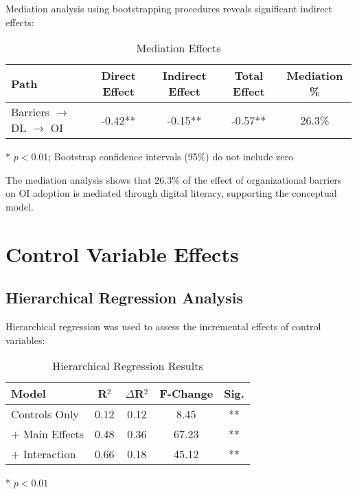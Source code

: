 Mediation analysis using bootstrapping procedures reveals significant indirect effects:

\begin{table}[H]
\centering
\caption{Mediation Effects}
\label{tab:mediation}
\begin{tabular}{@{}lcccc@{}}
\toprule
\textbf{Path} & \textbf{Direct Effect} & \textbf{Indirect Effect} & \textbf{Total Effect} & \textbf{Mediation \%} \\
\midrule
Barriers $\rightarrow$ DL $\rightarrow$ OI & -0.42** & -0.15** & -0.57** & 26.3\% \\
\bottomrule
\end{tabular}
\begin{tablenotes}
\item ** $p < 0.01$; Bootstrap confidence intervals (95\%) do not include zero
\end{tablenotes}
\end{table}

The mediation analysis shows that 26.3\% of the effect of organizational barriers on OI adoption is mediated through digital literacy, supporting the conceptual model.

\section{Control Variable Effects}

\subsection{Hierarchical Regression Analysis}

Hierarchical regression was used to assess the incremental effects of control variables:

\begin{table}[H]
\centering
\caption{Hierarchical Regression Results}
\label{tab:hierarchical}
\begin{tabular}{@{}lcccc@{}}
\toprule
\textbf{Model} & \textbf{R$^2$} & \textbf{$\Delta$R$^2$} & \textbf{F-Change} & \textbf{Sig.} \\
\midrule
Controls Only & 0.12 & 0.12 & 8.45 & ** \\
+ Main Effects & 0.48 & 0.36 & 67.23 & ** \\
+ Interaction & 0.66 & 0.18 & 45.12 & ** \\
\bottomrule
\end{tabular}
\begin{tablenotes}
\item ** $p < 0.01$
\end{tablenotes}
\end{table}

